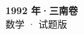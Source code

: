 \documentclass[zihao=-4, a4paper]{ctexart}
\begin{document}
\begin{center}
  {\Large\bfseries 1992 年·三南卷}\\[4pt]
  {\large 数学 · 试题版}
\end{center}
\medskip
{}

\end{document}
